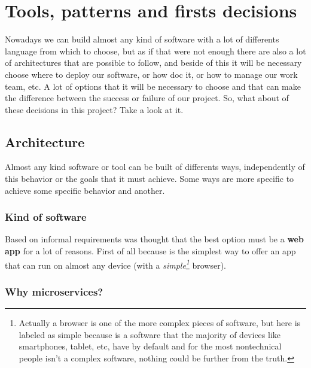 \chapter{Tools, patterns and firsts decisions}

Nowadays we can build almost any kind of software with a lot of differents
language from which to choose, but as if that were not enough there
are also a lot of architectures that are possible to follow, and beside
of this it will be necessary choose where to deploy our software, or how
doc it, or how to manage our work team, etc. A lot of options that it
will be necessary to choose and that can make the difference between the
success or failure of our project. So, what about of these decisions
in this project? Take a look at it.

\section{Architecture}

Almost any kind software or tool can be built of differents ways, independently
of this behavior or the goals that it must achieve. Some ways are more specific
to achieve some specific behavior and another.

\subsection{Kind of software}
Based on informal requirements was thought that the best option must be a
\textbf{web app} for a lot of reasons. First of all because is the simplest
way to offer an app that can run on almost any device (with a \textit{
simple\footnote{Actually a browser is one of the more complex pieces of
software, but here is labeled as simple because is a software that the
majority of devices like smartphones, tablet, etc, have by default and for
the most nontechnical people isn't a complex software, nothing could be
further from the truth.}} browser).

\subsection{Why microservices?}

